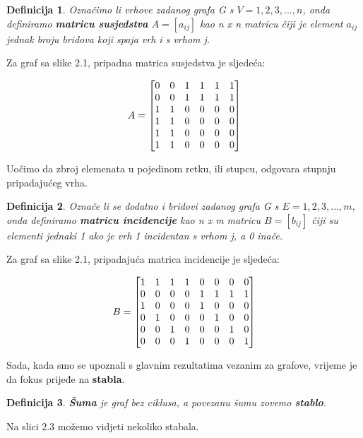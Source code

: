 \documentclass[times, utf8, zavrsni]{fer}
\newtheorem{definition}{Definicija}[section]
\begin{document}
\begin{definition}
	Označimo li vrhove zadanog grafa G s $V = {1, 2, 3,..., n}$, onda definiramo \textbf{matricu susjedstva} $A = [a_{ij}]$ kao n x n matricu čiji je element $a_{ij}$ jednak broju bridova koji spaja vrh i s vrhom j.
\end{definition}

Za graf sa slike 2.1, pripadna matrica susjedstva je sljedeća:

\[
\centering
A = 
\begin{bmatrix}
	0 & 0 & 1 & 1 & 1 & 1 \\
	0 & 0 & 1 & 1 & 1 & 1\\
	1 & 1 & 0 & 0 & 0 & 0 \\
	1 & 1 & 0 & 0 & 0 & 0 \\
	1 & 1 & 0 & 0 & 0 & 0 \\
	1 & 1 & 0 & 0 & 0 & 0
\end{bmatrix}
\]

Uočimo da zbroj elemenata u pojedinom retku, ili stupcu, odgovara stupnju pripadajućeg vrha.

\begin{definition}
	Označe li se dodatno i bridovi zadanog grafa G s $E = {1, 2, 3, ..., m}$, onda definiramo \textbf{matricu incidencije} kao n x m matricu $B = [b_{ij}]$ čiji su elementi jednaki 1 ako je vrh 1 incidentan s vrhom j, a 0 inače.
\end{definition}

Za graf sa slike 2.1, pripadajuća matrica incidencije je sljedeća:

\[
\centering
B = 
\begin{bmatrix}
	1 & 1 & 1 & 1 & 0 & 0 & 0 & 0 \\
	0 & 0 & 0 & 0 & 1 & 1 & 1 & 1 \\
	1 & 0 & 0 & 0 & 1 & 0 & 0 & 0 \\
	0 & 1 & 0 & 0 & 0 & 1 & 0 & 0 \\
	0 & 0 & 1 & 0 & 0 & 0 & 1 & 0 \\
	0 & 0 & 0 & 1 & 0 & 0 & 0 & 1
\end{bmatrix}
\]

Sada, kada smo se upoznali s glavnim rezultatima vezanim za grafove, vrijeme je da fokus prijeđe na \textbf{stabla}.

\begin{definition}
	\textbf{Šuma} je graf bez ciklusa, a povezanu šumu zovemo \textbf{stablo}.
\end{definition}

Na slici 2.3 možemo vidjeti nekoliko stabala.
\end{document}

